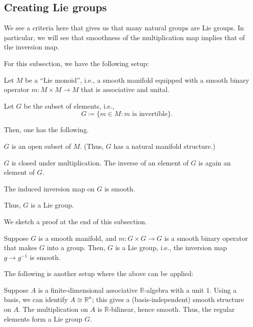 \documentclass[12pt]{article}
\begin{document}
\subsection{Creating Lie groups}

We see a criteria here that gives us that many natural groups are Lie groups.
In particular, we will see that smoothness of the multiplication map implies that of the inversion map.

For this subsection, we have the following setup:

\begin{tcolorbox}
	Let $M$ be a ``Lie monoid'', i.e., a smooth manifold equipped with a smooth binary operator $m \colon M \times M \to M$ that is associative and unital.

	Let $G$ be the subset of  elements, i.e.,
	\begin{equation*} 
		G \coloneqq \{m \in M : m \text{ is invertible}\}.
	\end{equation*}
\end{tcolorbox}

Then, one has the following.

\begin{thm} \label{thm:lie-monoid-invertible-subgroup}
	$G$ is an open subset of $M$. (Thus, $G$ has a natural manifold structure.)

	$G$ is closed under multiplication. The inverse of an element of $G$ is again an element of $G$.

	The induced inversion map on $G$ is smooth. 

	Thus, $G$ is a Lie group.
\end{thm}
We sketch a proof at the end of this subsection.

\begin{cor} \label{cor:inversion-automatically-smooth}
	Suppose $G$ is a smooth manifold, and $m \colon G \times G \to G$ is a smooth binary operator that makes $G$ into a group. \newline
	Then, $G$ is a Lie group, i.e., the inversion map $g \to g^{-1}$ is smooth.
\end{cor}

The following is another setup where the above can be applied:

Suppose $A$ is a finite-dimensional associative $\mathbb{R}$-algebra with a unit $1$. 
Using a basis, we can identify $A \cong \mathbb{R}^{n}$; this gives a (basis-independent) smooth structure on $A$. 
The multiplication on $A$ is $\mathbb{R}$-bilinear, hence smooth. Thus, the regular elements form a Lie group $G$.
\end{document}
